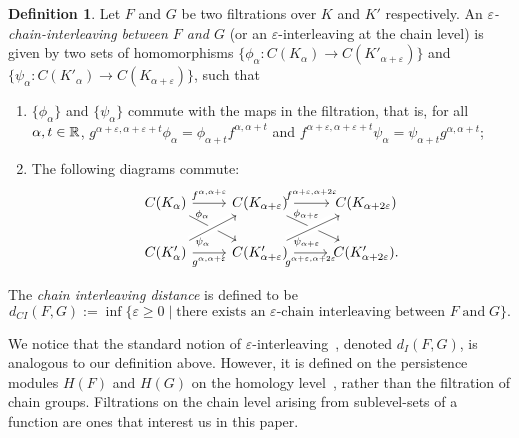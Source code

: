 \documentclass[10pt,a4paper]{amsart}
\newcommand {\mm}[1] {\ifmmode{#1}\else{\mbox{\(#1\)}}\fi}
\newcommand{\Rspace}        {\mm{\mathbb{R}}}
\newcommand{\eps}        {\varepsilon}
\theoremstyle{definition}
\newtheorem{definition}[theorem]{Definition}
\theoremstyle{remark}
\begin{document}
\begin{definition}
\label{def:chain-interleaving}
Let $F$ and $G$ be two filtrations over  $K$ and $K'$ respectively. 
An \emph{$\eps$-chain-interleaving between $F$ and $G$} (or an $\eps$-interleaving at the chain level) is given by two sets of homomorphisms $\{\phi_\alpha : C(K_\alpha) \xrightarrow{} C(K'_{\alpha+\eps}) \}$ and $\{\psi_\alpha : C(K'_{\alpha}) \xrightarrow{} C(K_{\alpha+\eps}) \}$, such that 
\begin{enumerate}
    \item $\{ \phi_\alpha \}$ and $\{\psi_\alpha \}$ commute with the maps in the filtration, that is, for all $\alpha,t \in \Rspace$, $g^{\alpha+\eps,\alpha+\eps + t} \phi_\alpha = \phi_{\alpha+t} f^{\alpha, \alpha+t}$ and $f^{\alpha+\eps,\alpha+\eps+t} \psi_\alpha = \psi_{\alpha+t} g^{\alpha, \alpha+t}$; 
    \item The following diagrams commute: 
    \begin{equation}
      \begin{tikzcd}
  C(K_\alpha)
    \ar[r,"f^{\alpha, \alpha+\eps}"]
    \ar[dr, "\phi_\alpha", very near start, outer sep = -2pt]
  & C(K_{\alpha+\eps})
    \ar[r, "f^{\alpha+\eps, \alpha+2\eps}"]
    \ar[dr, "\phi_{\alpha+\eps}", very near start, outer sep = -2pt]
  & C(K_{\alpha+2\eps})
  \\
  C(K'_\alpha)
    \ar[r, swap,"g^{\alpha, \alpha+\eps}"]
    \ar[ur, crossing over, "\psi_\alpha"', very near start, outer sep = -2pt]
  & C(K'_{\alpha+\eps})
    \ar[r, swap,"g^{\alpha+\eps, \alpha+2\eps}"]
    \ar[ur, crossing over, "\psi_{\alpha+\eps}"', very near start, outer sep = -2pt]
  & C(K'_{\alpha+2\eps}).
  \end{tikzcd}
    \end{equation}
\end{enumerate}
\noindent The \emph{chain interleaving distance} is defined to be 
\begin{equation}
d_{CI}(F, G) := \inf \{\eps\geq 0 \mid \text{there exists an $\eps$-chain interleaving between } F\; \text{and}\; G\}.
\end{equation}
\end{definition}

We notice that the standard notion of $\eps$-interleaving~\cite{ChazalCohenSteinerGlisse2009}, denoted $d_I(F,G)$, is analogous to our definition above. However, it is defined on the persistence modules $H(F)$ and $H(G)$ on the homology level~\cite{ChazalCohenSteinerGlisse2009}, rather than the filtration of chain groups.  
Filtrations on the chain level arising from sublevel-sets of a function are ones that interest us in this paper.
\end{document}
